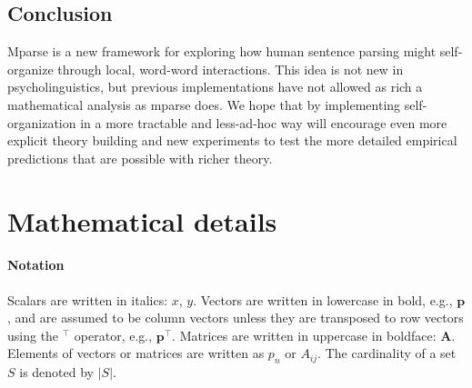 \documentclass[a4paper, 12pt]{article}
\newcommand{\todo}[1]{\textcolor{red}{\textbf{TODO: #1}}}
\begin{document}


\subsection{Conclusion}
Mparse is a new framework for exploring how human sentence parsing might
self-organize through local, word-word interactions. This idea is not new in
psycholinguistics, but previous implementations have not allowed as rich a
mathematical analysis as mparse does. We hope that by implementing
self-organization in a more tractable and less-ad-hoc way will encourage even
more explicit theory building and new experiments to test the more detailed
empirical predictions that are possible with richer theory.


%

\appendix

\section{Mathematical details}
\paragraph{Notation} Scalars are written in italics: $x$, $y$. Vectors are
written in lowercase in bold, e.g., $\mathbf{p}$, and are assumed to be column
vectors unless they are transposed to row vectors using the $^\intercal$
operator, e.g., $\mathbf{p}^\intercal$. Matrices are written in uppercase in
boldface: $\mathbf{A}$. Elements of vectors or matrices are written as $p_n$ or
$A_{ij}$. The cardinality of a set $S$ is denoted by $|S|$.
\end{document}
